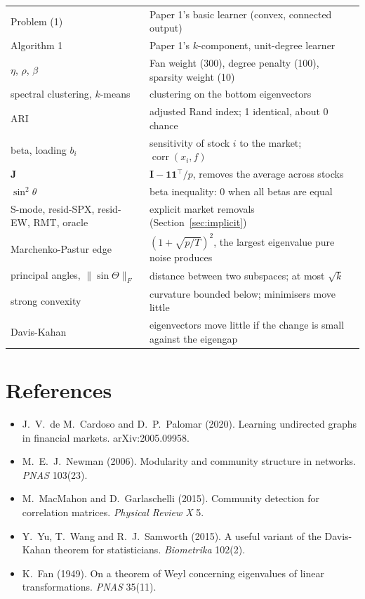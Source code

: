 \documentclass[11pt,a4paper]{article}
\newcommand{\Imat}{\mathbf{I}}
\newcommand{\Jmat}{\mathbf{J}}
\newcommand{\one}{\mathbf{1}}
\theoremstyle{remark}
\begin{document}
\begin{center}
\begin{tabular}{>{\raggedright\arraybackslash}p{3.6cm}>{\raggedright\arraybackslash}p{11.0cm}}
Problem (1) & Paper 1's basic learner (convex, connected output) \\
Algorithm 1 & Paper 1's $k$-component, unit-degree learner \\
$\eta$, $\rho$, $\beta$ & Fan weight (300), degree penalty (100), sparsity weight (10) \\
spectral clustering, $k$-means & clustering on the bottom eigenvectors \\
ARI & adjusted Rand index; 1 identical, about 0 chance \\
beta, loading $b_i$ & sensitivity of stock $i$ to the market; $\operatorname{corr}(x_i,f)$ \\
$\Jmat$ & $\Imat-\one\one^\top/p$, removes the average across stocks \\
$\sin^2\theta$ & beta inequality: 0 when all betas are equal \\
S-mode, resid-SPX, resid-EW, RMT, oracle & explicit market removals (Section~\ref{sec:implicit}) \\
Marchenko-Pastur edge & $(1+\sqrt{p/T})^2$, the largest eigenvalue pure noise produces \\
principal angles, $\lVert\sin\Theta\rVert_F$ & distance between two subspaces; at most $\sqrt k$ \\
strong convexity & curvature bounded below; minimisers move little \\
Davis-Kahan & eigenvectors move little if the change is small against the eigengap \\
\bottomrule
\end{tabular}
\end{center}

\section*{References}
\begin{itemize}[leftmargin=1.2em]
\item J.~V.~de M.~Cardoso and D.~P.~Palomar (2020). Learning undirected graphs in
  financial markets. arXiv:2005.09958.
\item M.~E.~J.~Newman (2006). Modularity and community structure in networks.
  \emph{PNAS} 103(23).
\item M.~MacMahon and D.~Garlaschelli (2015). Community detection for correlation
  matrices. \emph{Physical Review X} 5.
\item Y.~Yu, T.~Wang and R.~J.~Samworth (2015). A useful variant of the Davis-Kahan
  theorem for statisticians. \emph{Biometrika} 102(2).
\item K.~Fan (1949). On a theorem of Weyl concerning eigenvalues of linear
  transformations. \emph{PNAS} 35(11).
\end{itemize}
\end{document}
